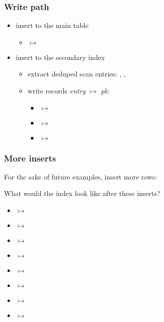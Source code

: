 \begin{frame}
  \frametitle{Write path}
  \pause

  \begin{itemize}
    \item insert to the main table
      \pause
      \begin{itemize}
        \item {} $\mapsto$ 
      \end{itemize}
      \pause
    \item insert to the secondary index
      \pause
      \begin{itemize}
        \item extract deduped scan entries: , ,
          \pause
        \item write records \emph{entry} $\mapsto$ \emph{pk}:
          \pause
          \begin{itemize}
            \item {} $\mapsto$ 
              \pause
            \item {} $\mapsto$ 
              \pause
            \item {} $\mapsto$ 
          \end{itemize}
      \end{itemize}
  \end{itemize}
\end{frame}

\begin{frame}
  \frametitle{More inserts}
  For the sake of future examples, insert more rows:



  \pause

  What would the index look like after these inserts?
  \pause

  \begin{itemize}
    \item {} $\mapsto$ 
    \item {} $\mapsto$ 
    \item {} $\mapsto$ 
    \item {} $\mapsto$ 
    \item {} $\mapsto$ 
    \item {} $\mapsto$ 
    \item {} $\mapsto$ 
    \item {} $\mapsto$ 
  \end{itemize}
\end{frame}

